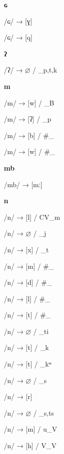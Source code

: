 \begin{center}\textbf{ɢ}\end{center}
\begin{multicols}{4}
\noindent /ɢ/ → [ɣ]

\noindent /ɢ/ → [q]

\end{multicols}

\begin{center}\textbf{ʔ}\end{center}
\begin{multicols}{4}
\noindent /ʔ/ → $\varnothing$ / \_{p,t,k}

\end{multicols}

\begin{center}\textbf{m}\end{center}
\begin{multicols}{4}
\noindent /m/ → [w] / \_B

\noindent /m/ → [ʔ] / \_p

\noindent /m/ → [b] / \#\_

\noindent /m/ → [w] / \#\_

\end{multicols}

\begin{center}\textbf{mb}\end{center}
\begin{multicols}{4}
\noindent /mb/ → [mː]

\end{multicols}

\begin{center}\textbf{n}\end{center}
\begin{multicols}{4}
\noindent /n/ → [l] / CV\_m

\noindent /n/ → $\varnothing$ / \_j

\noindent /n/ → [x] / \_t

\noindent /n/ → [m] / \#\_

\noindent /n/ → [d] / \#\_

\noindent /n/ → [l] / \#\_

\noindent /n/ → [t] / \#\_

\noindent /n/ → $\varnothing$ / \_ti

\noindent /n/ → [t] / \_k

\noindent /n/ → [t] / \_kʷ

\noindent /n/ → $\varnothing$ / \_s

\noindent /n/ → [r]

\noindent /n/ → $\varnothing$ / \_{s,ts}

\noindent /n/ → [m] / u\_V

\noindent /n/ → [h] / V\_V

\end{multicols}

